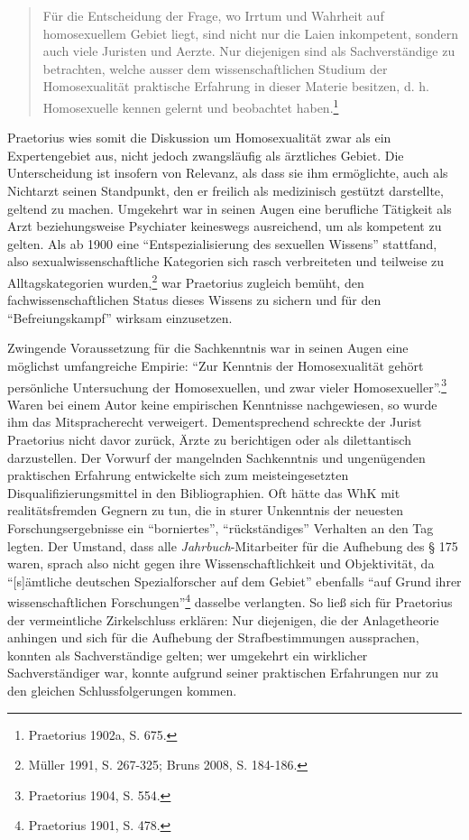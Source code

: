 \documentclass[a4paper,
fontsize=11pt,
oneside,
numbers=noperiodatend,
parskip=half-,
bibliography=totoc,
final
]{scrartcl}
\begin{document}
\begin{quote}
Für die Entscheidung der Frage, wo Irrtum und Wahrheit auf homosexuellem
Gebiet liegt, sind nicht nur die Laien inkompetent, sondern auch viele
Juristen und Aerzte. Nur diejenigen sind als Sachverständige zu
betrachten, welche ausser dem wissenschaftlichen Studium der
Homosexualität praktische Erfahrung in dieser Materie besitzen, d. h.
Homosexuelle kennen gelernt und beobachtet haben.\footnote{Praetorius
  1902a, S. 675.}
\end{quote}

Praetorius wies somit die Diskussion um Homosexualität zwar als ein
Expertengebiet aus, nicht jedoch zwangsläufig als ärztliches Gebiet. Die
Unterscheidung ist insofern von Relevanz, als dass sie ihm ermöglichte,
auch als Nichtarzt seinen Standpunkt, den er freilich als medizinisch
gestützt darstellte, geltend zu machen. Umgekehrt war in seinen Augen
eine berufliche Tätigkeit als Arzt beziehungsweise Psychiater keineswegs
ausreichend, um als kompetent zu gelten. Als ab 1900 eine
\enquote{Entspezialisierung des sexuellen Wissens} stattfand, also
sexualwissenschaftliche Kategorien sich rasch verbreiteten und teilweise
zu Alltagskategorien wurden,\footnote{Müller 1991, S. 267-325; Bruns
  2008, S. 184-186.} war Praetorius zugleich bemüht, den
fachwissenschaftlichen Status dieses Wissens zu sichern und für den
\enquote{Befreiungskampf} wirksam einzusetzen.

Zwingende Voraussetzung für die Sachkenntnis war in seinen Augen eine
möglichst umfangreiche Empirie: \enquote{Zur Kenntnis der Homosexualität
gehört persönliche Untersuchung der Homosexuellen, und zwar vieler
Homosexueller}.\footnote{Praetorius 1904, S. 554.} Waren bei einem Autor
keine empirischen Kenntnisse nachgewiesen, so wurde ihm das
Mitspracherecht verweigert. Dementsprechend schreckte der Jurist
Praetorius nicht davor zurück, Ärzte zu berichtigen oder als
dilettantisch darzustellen. Der Vorwurf der mangelnden Sachkenntnis und
ungenügenden praktischen Erfahrung entwickelte sich zum
meisteingesetzten Disqualifizierungsmittel in den Bibliographien. Oft
hätte das WhK mit realitätsfremden Gegnern zu tun, die in sturer
Unkenntnis der neuesten Forschungsergebnisse ein \enquote{borniertes},
\enquote{rückständiges} Verhalten an den Tag legten. Der Umstand, dass
alle \emph{Jahrbuch}-Mitarbeiter für die Aufhebung des § 175 waren,
sprach also nicht gegen ihre Wissenschaftlichkeit und Objektivität, da
\enquote{{[}s{]}ämtliche deutschen Spezialforscher auf dem Gebiet}
ebenfalls \enquote{auf Grund ihrer wissenschaftlichen
Forschungen}\footnote{Praetorius 1901, S. 478.} dasselbe verlangten. So
ließ sich für Praetorius der vermeintliche Zirkelschluss erklären: Nur
diejenigen, die der Anlagetheorie anhingen und sich für die Aufhebung
der Strafbestimmungen aussprachen, konnten als Sachverständige gelten;
wer umgekehrt ein wirklicher Sachverständiger war, konnte aufgrund
seiner praktischen Erfahrungen nur zu den gleichen Schlussfolgerungen
kommen.
\end{document}
